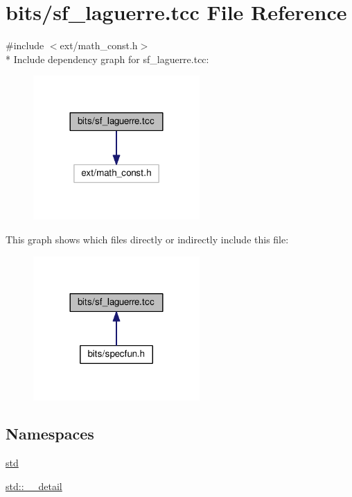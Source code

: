 \hypertarget{sf__laguerre_8tcc}{}\section{bits/sf\+\_\+laguerre.tcc File Reference}
\label{sf__laguerre_8tcc}
{\ttfamily \#include $<$ext/math\+\_\+const.\+h$>$}\\*
Include dependency graph for sf\+\_\+laguerre.\+tcc\+:
\nopagebreak
\begin{figure}[H]
\begin{center}
\leavevmode
\includegraphics[width=180pt]{sf__laguerre_8tcc__incl}
\end{center}
\end{figure}
This graph shows which files directly or indirectly include this file\+:
\nopagebreak
\begin{figure}[H]
\begin{center}
\leavevmode
\includegraphics[width=180pt]{sf__laguerre_8tcc__dep__incl}
\end{center}
\end{figure}
\subsection*{Namespaces}
\begin{DoxyCompactItemize}
\item 
 \hyperlink{namespacestd}{std}
\item 
 \hyperlink{namespacestd_1_1____detail}{std\+::\+\_\+\+\_\+detail}
\end{DoxyCompactItemize}
